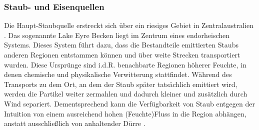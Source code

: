 \documentclass[12pt,a4paper,onecolumn]{scrartcl}
\begin{document}
\subsubsection{Staub- und Eisenquellen} \label{sec:staubquellen}
Die Haupt-Staubquelle erstreckt sich über ein riesiges Gebiet in Zentralaustralien \citep{Shao.2011}. Das sogenannte Lake Eyre Becken liegt im Zentrum eines endorheischen Systems. Dieses System führt dazu, dass die Bestandteile emittierten Staubs anderen Regionen entstammen können und über weite Strecken transportiert wurden. Diese Ursprünge sind i.d.R. benachbarte Regionen höherer Feuchte, in denen chemische und physikalische Verwitterung stattfindet. Während des Transports zu dem Ort, an dem der Staub später tatsächlich emittiert wird, werden die Partikel weiter zermahlen und dadurch kleiner und zusätzlich durch Wind separiert. Dementsprechend kann die Verfügbarkeit von Staub entgegen der Intuition von einem ausreichend hohen (Feuchte)Fluss in die Region abhängen, anstatt ausschließlich von anhaltender Dürre \citep{Marx.2018}.
\end{document}
